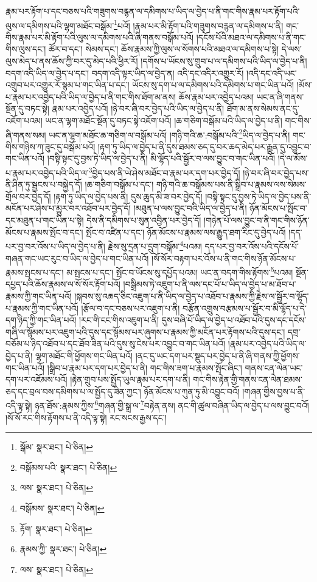 རྣམ་པར་རྟོག་པ་དང་བཅས་པའི་གཟུགས་བརྙན་ལ་དམིགས་པ་ཡིད་ལ་བྱེད་པ་ནི་གང་གིས་རྣམ་པར་རྟོག་པའི་ལུས་ལ་དམིགས་པའི་ལྷག་མཐོང་བསྒོམ་\footnote{སྒོམ་  སྣར་ཐང་།  པེ་ཅིན། }པའོ། །རྣམ་པར་མི་རྟོག་པའི་གཟུགས་བརྙན་ལ་དམིགས་པ་ནི། གང་གིས་རྣམ་པར་མི་རྟོག་པའི་ལུས་ལ་དམིགས་པའི་ཞི་གནས་བསྒོམ་པའོ། །དངོས་པོའི་མཐའ་ལ་དམིགས་པ་ནི་གང་གིས་ལུས་དང་། ཚོར་བ་དང་། སེམས་དང་། ཆོས་རྣམས་ཀྱི་ལུས་ལ་སོགས་པའི་མཐའ་ལ་དམིགས་པ་སྟེ། དེ་ལས་ལུས་མེད་པ་ནས་ཆོས་ཀྱི་བར་དུ་མེད་པའི་ཕྱིར་རོ། །དགོས་པ་ཡོངས་སུ་གྲུབ་པ་ལ་དམིགས་པའི་ཡིད་ལ་བྱེད་པ་ནི། བདག་འདི་ཡིད་ལ་བྱེད་པ་དང་། བདག་འདི་ལྟར་ཡིད་ལ་བྱེད་ན། འདི་དང་འདིར་འགྱུར་རོ། །འདི་དང་འདི་ཡང་འགྲུབ་པར་འགྱུར་རོ་སྙམ་པ་གང་ཡིན་པ་དང་། ཡོངས་སུ་དག་པ་ལ་དམིགས་པའི་དམིགས་པ་གང་ཡིན་པའོ། །མོས་པ་རྣམ་པར་འབྱེད་པའི་ཡིད་ལ་བྱེད་པ་ནི་གང་གིས་ཐོག་མ་ནས། ཆོས་རྣམ་པར་འབྱེད་པའམ། ཡང་ན་ཞི་གནས་སྔོན་དུ་བཏང་སྟེ། རྣམ་པར་འབྱེད་པའོ། །ཉེ་བར་ཞི་བར་བྱེད་པའི་ཡིད་ལ་བྱེད་པ་ནི། ཐོག་མ་ནས་སེམས་ནང་དུ་འཇོག་པའམ། ཡང་ན་ལྷག་མཐོང་སྔོན་དུ་བཏང་སྟེ་འཇོག་པའོ། །ཆ་གཅིག་བསྒོམ་པའི་ཡིད་ལ་བྱེད་པ་ནི། གང་གིས་ཞི་གནས་སམ། ཡང་ན་ལྷག་མཐོང་ཆ་གཅིག་ལ་བསྒོམ་པའོ། །གཉི་གའི་ཆ་:བསྒོམ་པའི་\footnote{བསྒོམས་པའི་  སྣར་ཐང་།  པེ་ཅིན། }ཡིད་ལ་བྱེད་པ་ནི། གང་གིས་གཉིས་ཀ་ཟུང་དུ་བསྒོམ་པའོ། །རྟག་ཏུ་ཡིད་ལ་བྱེད་པ་ནི་དུས་ཐམས་ཅད་དུ་བར་ཆད་མེད་པར་རྒྱུན་དུ་འབྱུང་བ་གང་ཡིན་པའོ། །བསྟི་སྟང་དུ་བྱས་ཏེ་ཡིད་ལ་བྱེད་པ་ནི། མི་ལྷོད་པའི་སྦྱོར་བ་ལས་བྱུང་བ་གང་ཡིན་པའོ། །དེ་ལ་མོས་པ་རྣམ་པར་འབྱེད་པའི་ཡིད་ལ་\footnote{ལས་  སྣར་ཐང་།  པེ་ཅིན། }བྱེད་པས་ནི་ཡེ་ཤེས་མཐོང་བ་རྣམ་པར་དག་པར་བྱེད་དོ། །ཉེ་བར་ཞི་བར་བྱེད་པས་ནི་ཤིན་ཏུ་སྦྱངས་པ་བསྐྱེད་དོ། །ཆ་གཅིག་བསྒོམ་པ་དང་། གཉི་གའི་ཆ་བསྒོམས་པས་ནི་སྒྲིབ་པ་རྣམས་ལས་སེམས་གྲོལ་བར་བྱེད་དོ། །རྟག་ཏུ་ཡིད་ལ་བྱེད་པས་ནི། དུས་ཆུད་མི་ཟ་བར་བྱེད་དོ། །བསྟི་སྟང་དུ་བྱས་ཏེ་ཡིད་ལ་བྱེད་པས་ནི་མངོན་པར་ཤེས་པ་མྱུར་བར་འཐོབ་པར་བྱེད་དོ། །མཐུན་པ་ལས་བྱུང་བའི་ཡིད་ལ་བྱེད་པ་ནི། ཉོན་མོངས་པ་སྤོང་བ་དང་མཐུན་པ་གང་ཡིན་པ་སྟེ། དེས་ནི་དམིགས་པ་སུན་འབྱིན་པར་བྱེད་དོ། །གཉེན་པོ་ལས་བྱུང་བ་ནི་གང་གིས་ཉོན་མོངས་པ་རྣམས་སྤོང་བ་དང་། སྤོང་བ་འཛིན་པ་དང་། ཉོན་མོངས་པ་རྣམས་ལས་རྒྱུད་ཐག་རིང་དུ་བྱེད་པའོ། །དད་པར་བྱ་བར་འོས་པ་ཡིད་ལ་བྱེད་པ་ནི། རྗེས་སུ་དྲན་པ་དྲུག་བསྒོམ་\footnote{བསྒོམས་  སྣར་ཐང་།  པེ་ཅིན། }པའམ། དད་པར་བྱ་བར་འོས་པའི་དངོས་པོ་གཞན་གང་ཡང་རུང་བ་ཡིད་ལ་བྱེད་པ་གང་ཡིན་པའོ། །སོ་སོར་བརྟག་པར་འོས་པ་ནི་གང་གིས་ཉོན་མོངས་པ་རྣམས་སྤངས་པ་དང་། མ་སྤངས་པ་དང་། སྤོང་བ་ཡོངས་སུ་དཔྱོད་པའམ། ཡང་ན་བདག་གིས་རྟོགས་\footnote{རྟོག་  སྣར་ཐང་།  པེ་ཅིན། }པའམ། སྔོན་དཔྱད་པའི་ཆོས་རྣམས་ལ་སོ་སོར་རྟོག་པའོ། །བསྒྲིམས་ཏེ་འཇུག་པ་ནི་ལས་དང་པོ་པ་ཡིད་ལ་བྱེད་པ་མ་ཐོབ་པ་རྣམས་ཀྱི་གང་ཡིན་པའོ། །སྐབས་སུ་འཆད་ཅིང་འཇུག་པ་ནི་ཡིད་ལ་བྱེད་པ་འཐོབ་པ་རྣམས་ཀྱི་རྗེས་ལ་སྦྱོར་བ་ལྷོད་པ་རྣམས་ཀྱི་གང་ཡིན་པའོ། །རྩོལ་བ་དང་བཅས་པར་འཇུག་པ་ནི། བརྩོན་འགྲུས་བརྩམས་པ་སྦྱོར་བ་མི་ལྷོད་པ་དེ་དག་ཉིད་ཀྱི་གང་ཡིན་པའོ། །རང་གི་ངང་གིས་འཇུག་པ་ནི། དུས་བཞི་པོ་ཡིད་ལ་བྱེད་པ་འཐོབ་པའི་དུས་དང་དངོས་གཞི་ལ་སྙོམས་པར་འཇུག་པའི་དུས་དང་སྙོམས་པར་ཞུགས་པ་རྣམས་ཀྱི་མངོན་པར་རྟོགས་པའི་དུས་དང་། དགྲ་བཅོམ་པ་ཉིད་འཐོབ་པ་དང་ཐོབ་ཟིན་པའི་དུས་སུ་ངེས་པར་འབྱུང་བ་གང་ཡིན་པའོ། །རྣམ་པར་འབྱེད་པའི་ཡིད་ལ་བྱེད་པ་ནི། ལྷག་མཐོང་གི་ཕྱོགས་གང་ཡིན་པའོ། །ནང་དུ་ཡང་དག་པར་སྡུད་པར་བྱེད་པ་ནི་ཞི་གནས་ཀྱི་ཕྱོགས་གང་ཡིན་པའོ། །སྒྲིབ་པ་རྣམ་པར་དག་པར་བྱེད་པ་ནི། གང་གིས་ཟག་པ་རྣམས་སྤོང་ཞིང་། གནས་ངན་ལེན་ཡང་དག་པར་འཇོམས་པའོ། །རྟེན་གྲུབ་པས་སྤྱོད་ཡུལ་རྣམ་པར་དག་པ་ནི། གང་གིས་རྟེན་གྱི་གནས་ངན་ལེན་ཐམས་ཅད་དང་བྲལ་བས་དམིགས་པ་ལ་སྤྱོད་དུ་ཟིན་ཀྱང་། ཉོན་མོངས་པ་ཀུན་ཏུ་མི་འབྱུང་བའོ། །གཞན་གྱིས་བྱས་པ་ནི་འདི་ལྟ་སྟེ། ཉན་ཐོས་:རྣམས་ཀྱིས་\footnote{རྣམས་ཀྱི་  སྣར་ཐང་།  པེ་ཅིན། }གཞན་གྱི་སྒྲ་ལ་\footnote{ལས་  སྣར་ཐང་།  པེ་ཅིན། }བརྟེན་ནས། ནང་གི་ཚུལ་བཞིན་ཡིད་ལ་བྱེད་པ་ལས་བྱུང་བའོ། །སོ་སོ་རང་གིས་རྟོགས་པ་ནི་འདི་ལྟ་སྟེ། རང་སངས་རྒྱས་དང་། 